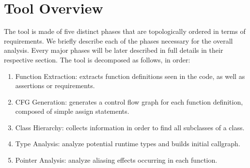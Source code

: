 \section{Tool Overview}
The tool is made of five distinct phases that are topologically ordered in terms
of requirements. We briefly describe each of the phases necessary for the
overall analysis. Every major phases will be later described in full details in
their respective section.
The tool is decomposed as follows, in order:
\begin{enumerate}
    \item{Function Extraction}: extracts function definitions seen in the code, as well as
    assertions or requirements.

    \item{CFG Generation}: generates a control flow graph for each function
    definition, composed of simple assign statements.

    \item{Class Hierarchy}: collects information in order to find all subclasses of a class.

    \item{Type Analysis}: analyze potential runtime types and builds initial callgraph.

    \item{Pointer Analysis}: analyze aliasing effects occurring in each function.
\end{enumerate}
